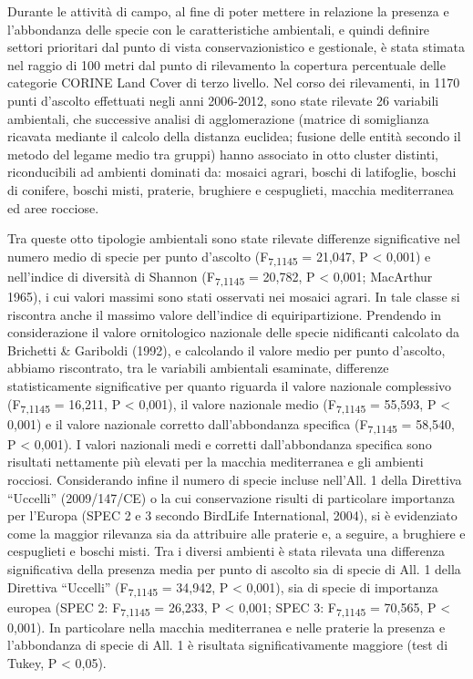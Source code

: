 Durante le attivit\`a di campo, al fine di poter mettere in relazione la
presenza e l{\textquoteright}abbondanza delle specie con le
caratteristiche ambientali, e quindi definire settori prioritari dal
punto di vista conservazionistico e gestionale, \`e stata stimata nel
raggio di 100 metri dal punto di rilevamento la copertura percentuale
delle categorie CORINE Land Cover di terzo livello. Nel corso dei
rilevamenti,  in 1170 punti d{\textquoteright}ascolto effettuati negli
anni 2006-2012, sono state rilevate 26 variabili ambientali, che
successive analisi di agglomerazione (matrice di somiglianza ricavata
mediante il calcolo della distanza euclidea; fusione delle entit\`a
secondo il metodo del legame medio tra gruppi) hanno associato in otto
cluster distinti, riconducibili ad ambienti dominati da: mosaici
agrari, boschi di latifoglie, boschi di conifere, boschi misti,
praterie, brughiere e cespuglieti, macchia mediterranea ed aree
rocciose. 

Tra queste otto tipologie ambientali sono state rilevate differenze
significative nel numero medio di specie per punto
d{\textquoteright}ascolto (F\textsubscript{7,1145} = 21,047, P
{\textless} 0,001) e nell{\textquoteright}indice di diversit\`a di
Shannon (F\textsubscript{7,1145} = 20,782, P {\textless} 0,001;
MacArthur 1965), i cui valori massimi sono stati osservati nei mosaici
agrari. In tale classe si riscontra anche il massimo valore
dell{\textquoteright}indice di equiripartizione. Prendendo in
considerazione il valore ornitologico nazionale delle specie
nidificanti calcolato da Brichetti \& Gariboldi (1992), e calcolando il
valore medio per punto d{\textquoteright}ascolto, abbiamo riscontrato,
tra le variabili ambientali esaminate, differenze statisticamente
significative per quanto riguarda il valore nazionale complessivo
(F\textsubscript{7,1145} = 16,211, P {\textless} 0,001), il valore
nazionale medio (F\textsubscript{7,1145} = 55,593, P {\textless} 0,001)
e il valore nazionale corretto dall{\textquoteright}abbondanza
specifica (F\textsubscript{7,1145} = 58,540, P {\textless} 0,001). I
valori nazionali medi e corretti dall{\textquoteright}abbondanza
specifica sono risultati nettamente pi\`u elevati per la macchia
mediterranea e gli ambienti rocciosi. Considerando infine il numero di
specie incluse nell{\textquoteright}All. 1 della Direttiva
{\textquotedblleft}Uccelli{\textquotedblright} (2009/147/CE) o la cui
conservazione risulti di particolare importanza per
l{\textquoteright}Europa (SPEC 2 e 3 secondo BirdLife International,
2004), si \`e evidenziato come la maggior rilevanza sia da attribuire
alle praterie e, a seguire, a brughiere e cespuglieti e boschi misti.
Tra i diversi ambienti \`e stata rilevata una differenza significativa
della presenza media per punto di ascolto sia di specie di All. 1 della
Direttiva {\textquotedblleft}Uccelli{\textquotedblright}
(F\textsubscript{7,1145} = 34,942, P {\textless} 0,001), sia di specie
di importanza europea (SPEC 2: F\textsubscript{7,1145} = 26,233, P
{\textless} 0,001; SPEC 3: F\textsubscript{7,1145} = 70,565, P
{\textless} 0,001). In particolare nella macchia mediterranea e nelle
praterie la presenza e l{\textquoteright}abbondanza di specie di All. 1
\`e risultata significativamente maggiore (test di Tukey, P {\textless}
0,05).

